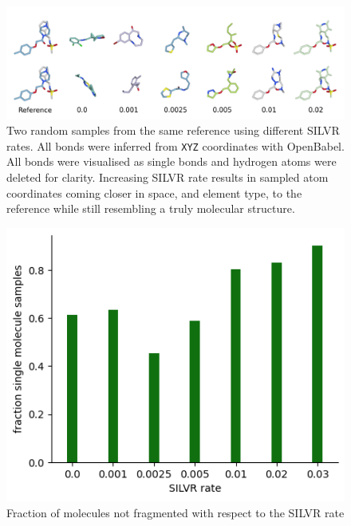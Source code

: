 \documentclass[journal=jacsat,manuscript=article]{achemso}
\begin{document}
\begin{suppinfo}
\begin{figure}[hb!]
    \centering
    \includegraphics[width=\textwidth]{paper/Figures/FigS2/fig_2_sample_vs_rate.png}
    \caption{Two random samples from the same reference using different SILVR rates. All bonds were inferred from \texttt{XYZ} coordinates with OpenBabel. All bonds were visualised as single bonds and hydrogen atoms were deleted for clarity. Increasing SILVR rate results in sampled atom coordinates coming closer in space, and element type, to the reference while still resembling a truly molecular structure.}
    \label{fig:examples_curated}
\end{figure}

\begin{figure}
    \centering
    \includegraphics[widht=0.5\textwidth]{paper/Figures/FigS3/FigS4.png}
    \caption{Fraction of molecules not fragmented with respect to the SILVR rate}
    \label{fig:fragmentation}
\end{figure}


\end{suppinfo}
\end{document}
